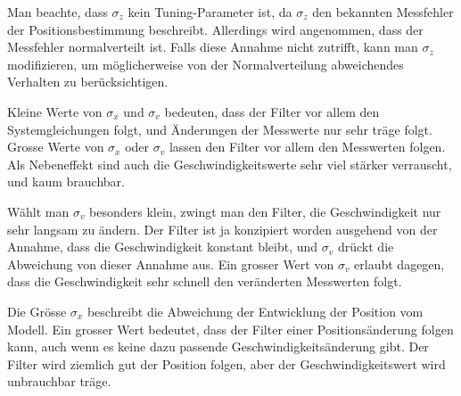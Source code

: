 Man beachte, dass $\sigma_z$ kein Tuning-Parameter ist, da $\sigma_z$
den bekannten Messfehler der Positionsbestimmung beschreibt.
Allerdings wird angenommen, dass der Messfehler normalverteilt ist.
Falls diese Annahme nicht zutrifft, kann man $\sigma_z$ modifizieren,
um möglicherweise von der Normalverteilung abweichendes Verhalten
zu berücksichtigen.

Kleine Werte von $\sigma_x$ und $\sigma_v$ bedeuten, dass der Filter
vor allem den Systemgleichungen folgt, und Änderungen der
Messwerte nur sehr träge folgt.
Grosse Werte von $\sigma_x$ oder $\sigma_v$ lassen den Filter vor allem
den Messwerten folgen. 
Als Nebeneffekt sind auch die Geschwindigkeitswerte sehr viel stärker
verrauscht, und kaum brauchbar.

Wählt man $\sigma_v$ besonders klein, zwingt man den Filter, die
Geschwindigkeit nur sehr langsam zu ändern.
Der Filter ist ja konzipiert worden ausgehend von der Annahme,
dass die Geschwindigkeit konstant bleibt, und $\sigma_v$ drückt
die Abweichung von dieser Annahme aus.
Ein grosser Wert von $\sigma_v$ erlaubt dagegen, dass die Geschwindigkeit
sehr schnell den veränderten Messwerten folgt.

Die Grösse $\sigma_x$ beschreibt die Abweichung der Entwicklung
der Position vom Modell.
Ein grosser Wert bedeutet, dass der Filter einer Positionsänderung
folgen kann, auch wenn es keine dazu passende Geschwindigkeitsänderung
gibt.
Der Filter wird ziemlich gut der Position folgen, aber der
Geschwindigkeitswert wird unbrauchbar träge.

